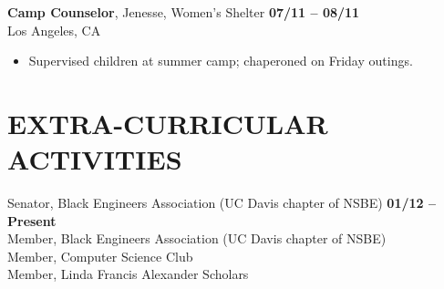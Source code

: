 \documentclass[line, letterpaper, 10pt]{res}
\begin{document}
\begin{resume}
    {\bf Camp Counselor}, Jenesse, Women's Shelter \hfill {\bf 07/11 -- 08/11} \\
    Los Angeles, CA
    \begin{itemize} \itemsep -2pt %
        \item Supervised children at summer camp; chaperoned on Friday outings.
    \end{itemize}


\section{EXTRA-CURRICULAR ACTIVITIES}
    Senator, Black Engineers Association (UC Davis chapter of NSBE) \hfill {\bf 01/12 -- Present} \\
    Member, Black Engineers Association (UC Davis chapter of NSBE) \\
    Member, Computer Science Club \\
    Member, Linda Francis Alexander Scholars \\


\end{resume}
\end{document}
